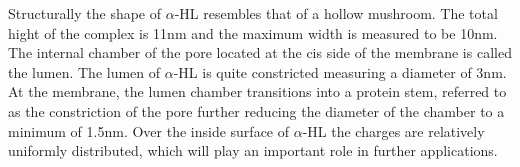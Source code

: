 Structurally the shape of $\alpha$-HL resembles that of a hollow mushroom. The total
hight of the complex is 11nm and the maximum width is measured to be 10nm. The internal
chamber of the pore located at the cis side of the membrane is called the lumen.
The lumen of $\alpha$-HL is quite constricted measuring a diameter of 3nm. At the
membrane, the lumen chamber transitions into a protein stem, referred to as the
constriction of the pore further reducing the diameter of the chamber to a minimum of
1.5nm. Over the inside surface of  $\alpha$-HL the charges are relatively uniformly
distributed, which will play an important role in further applications.\\

%
%
%
%

